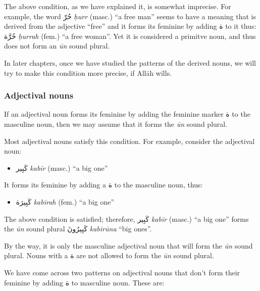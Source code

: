 \documentclass[
  10pt,
]{book}
\providecommand{\tightlist}{%
  \setlength{\itemsep}{0pt}\setlength{\parskip}{0pt}}
\begin{document}
The above condition, as we have explained it, is somewhat imprecise. For example, the word
\foreignlanguage{arabic}{حُرّ} \emph{ḥurr} (masc.) \enquote{a free man} seems to have a meaning that is derived from the adjective \enquote{free} and it forms its feminine by adding \foreignlanguage{arabic}{ة} to it thus:
\foreignlanguage{arabic}{حُرَّة} \emph{ḥurrah} (fem.) \enquote{a free woman}.
Yet it is considered a primitve noun, and thus does not form an \emph{ūn} sound plural.

In later chapters, once we have studied the patterns of the derived nouns, we will try to make this condition more precise, if Allāh wills.

\subsubsection{Adjectival nouns}\label{adjectival-nouns}

If an adjectival noun forms its feminine by adding the feminine marker \foreignlanguage{arabic}{ة} to the masculine noun, then we may assume that it forms the \emph{ūn} sound plural.

Most adjectival nouns satisfy this condition. For example, consider the adjectival noun:

\begin{itemize}
\tightlist
\item
  \foreignlanguage{arabic}{کَبِير} \emph{kabīr} (masc.) \enquote{a big one}
\end{itemize}

It forms its feminine by adding a \foreignlanguage{arabic}{ة} to the masculine noun, thus:

\begin{itemize}
\tightlist
\item
  \foreignlanguage{arabic}{کَبِيرَة} \emph{kabīrah} (fem.) \enquote{a big one}
\end{itemize}

The above condition is satisfied; therefore,
\foreignlanguage{arabic}{کَبِير} \emph{kabīr} (masc.) \enquote{a big one} forms the \emph{ūn} sound plural \foreignlanguage{arabic}{کَبِيرُونَ} \emph{kabīrūna} \enquote{big ones}.

By the way, it is only the masculine adjectival noun that will form the \emph{ūn} sound plural. Nouns with a \foreignlanguage{arabic}{ة} are not allowed to form the \emph{ūn} sound plural.

We have come across two patterns on adjectival nouns that don't form their feminine by adding \foreignlanguage{arabic}{ة} to masculine noun. These are:
\end{document}
